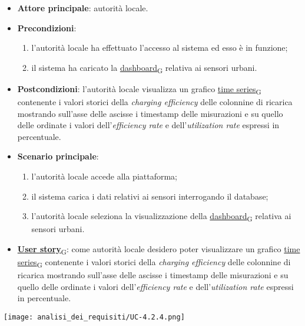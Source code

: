 \newpage
{}
\begin{itemize}
	\item \textbf{Attore principale}: autorità locale.
	\item \textbf{Precondizioni}:
	      \begin{enumerate}
		      \item l'autorità locale ha effettuato l'accesso al sistema ed esso è in funzione;
		      \item il sistema ha caricato la \href{https://7last.github.io/docs/pb/documentazione-interna/glossario\#dashboard}{dashboard\textsubscript{G}} relativa ai sensori urbani.
	      \end{enumerate}
	\item \textbf{Postcondizioni}: l'autorità locale visualizza un grafico \href{https://7last.github.io/docs/pb/documentazione-interna/glossario\#time-series}{time series\textsubscript{G}} contenente i valori storici della \textit{charging efficiency} delle colonnine di ricarica mostrando sull'asse delle ascisse i timestamp delle misurazioni e su quello delle ordinate i valori dell'\textit{efficiency rate} e dell'\textit{utilization rate} espressi in percentuale.
	\item \textbf{Scenario principale}:
	      \begin{enumerate}
		      \item l'autorità locale accede alla piattaforma;
		      \item il sistema carica i dati relativi ai sensori interrogando il database;
		      \item l'autorità locale seleziona la visualizzazione della \href{https://7last.github.io/docs/pb/documentazione-interna/glossario\#dashboard}{dashboard\textsubscript{G}} relativa ai sensori urbani.
	      \end{enumerate}
	\item \href{https://7last.github.io/docs/pb/documentazione-interna/glossario\#user-story}{\textbf{User story}\textsubscript{G}}:
	      come autorità locale desidero poter visualizzare un grafico \href{https://7last.github.io/docs/pb/documentazione-interna/glossario\#time-series}{time series\textsubscript{G}} contenente i valori storici della \textit{charging efficiency} delle colonnine di ricarica mostrando sull'asse delle ascisse i timestamp delle misurazioni e su quello delle ordinate i valori dell'\textit{efficiency rate} e dell'\textit{utilization rate} espressi in percentuale.
\end{itemize}
\begin{center}
	\texttt{[image: analisi\_dei\_requisiti/UC-4.2.4.png]}
\end{center}

